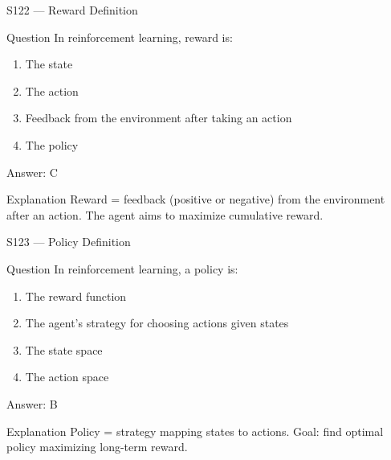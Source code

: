 \documentclass[aspectratio=169,8pt]{beamer}
\begin{document}
	\begin{frame}{S122 --- Reward Definition}
		\begin{block}{Question}
			In reinforcement learning, reward is:
			\begin{enumerate}
				\item The state
				\item The action
				\item Feedback from the environment after taking an action
				\item The policy
			\end{enumerate}
		\end{block}
		\begin{exampleblock}{Answer: C}\end{exampleblock}
		\begin{block}{Explanation}
			Reward = feedback (positive or negative) from the environment after an action. The agent aims to maximize cumulative reward.
		\end{block}
	\end{frame}
	
	\begin{frame}{S123 --- Policy Definition}
		\begin{block}{Question}
			In reinforcement learning, a policy is:
			\begin{enumerate}
				\item The reward function
				\item The agent's strategy for choosing actions given states
				\item The state space
				\item The action space
			\end{enumerate}
		\end{block}
		\begin{exampleblock}{Answer: B}\end{exampleblock}
		\begin{block}{Explanation}
			Policy = strategy mapping states to actions. Goal: find optimal policy maximizing long-term reward.
		\end{block}
	\end{frame}
	
\end{document}
